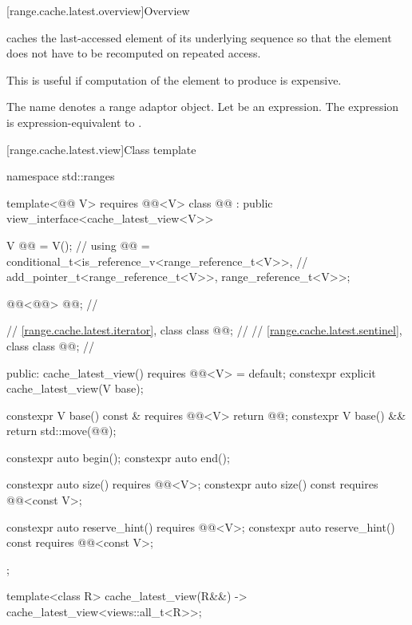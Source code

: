 [range.cache.latest.overview]{Overview}

\pnum
{} caches the last-accessed element of
its underlying sequence
so that the element does not have to be recomputed on repeated access.
\begin{note}
This is useful if computation of the element to produce is expensive.
\end{note}

\pnum
The name  denotes
a range adaptor object.
Let  be an expression.
The expression  is expression-equivalent to
.

[range.cache.latest.view]{Class template }

\begin{codeblock}
namespace std::ranges {
  template<@@ V>
    requires @@<V>
  class @@ : public view_interface<cache_latest_view<V>> {
    V @@ = V();                                                      // \expos
    using @@ = conditional_t<is_reference_v<range_reference_t<V>>, // \expos
                                  add_pointer_t<range_reference_t<V>>,
                                  range_reference_t<V>>;

    @@<@@> @@;                              // \expos

    // \ref{range.cache.latest.iterator}, class 
    class @@;                                                     // \expos
    // \ref{range.cache.latest.sentinel}, class 
    class @@;                                                     // \expos

  public:
    cache_latest_view() requires @@<V> = default;
    constexpr explicit cache_latest_view(V base);

    constexpr V base() const & requires @@<V> { return @@; }
    constexpr V base() && { return std::move(@@); }

    constexpr auto begin();
    constexpr auto end();

    constexpr auto size() requires @@<V>;
    constexpr auto size() const requires @@<const V>;

    constexpr auto reserve_hint() requires @@<V>;
    constexpr auto reserve_hint() const requires @@<const V>;
  };

  template<class R>
    cache_latest_view(R&&) -> cache_latest_view<views::all_t<R>>;
}
\end{codeblock}


